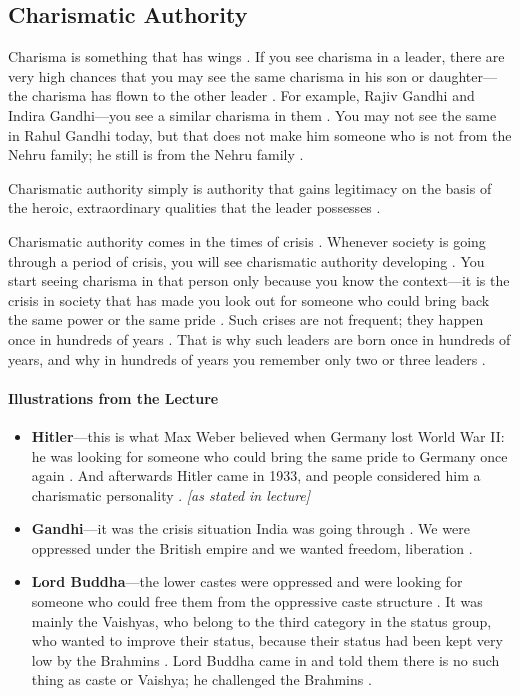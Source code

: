 \subsection{Charismatic Authority}
Charisma is something that has wings . If you see charisma in a leader, there are very high chances that you may see the same charisma in his son or daughter---the charisma has flown to the other leader .
For example, Rajiv Gandhi and Indira Gandhi---you see a similar charisma in them . You may not see the same in Rahul Gandhi today, but that does not make him someone who is not from the Nehru family; he still is from the Nehru family .

Charismatic authority simply is authority that gains legitimacy on the basis of the heroic, extraordinary qualities that the leader possesses .

\begin{KeyConcept}
Charismatic authority comes in the times of crisis . Whenever society is going through a period of crisis, you will see charismatic authority developing .
You start seeing charisma in that person only because you know the context---it is the crisis in society that has made you look out for someone who could bring back the same power or the same pride .
Such crises are not frequent; they happen once in hundreds of years . That is why such leaders are born once in hundreds of years, and why in hundreds of years you remember only two or three leaders .
\end{KeyConcept}

\paragraph{Illustrations from the Lecture}
\begin{itemize}
    \item \textbf{Hitler}---this is what Max Weber believed when Germany lost World War II: he was looking for someone who could bring the same pride to Germany once again . And afterwards Hitler came in 1933, and people considered him a charismatic personality . \textit{[as stated in lecture]}
    \item \textbf{Gandhi}---it was the crisis situation India was going through . We were oppressed under the British empire and we wanted freedom, liberation .
    \item \textbf{Lord Buddha}---the lower castes were oppressed and were looking for someone who could free them from the oppressive caste structure . It was mainly the Vaishyas, who belong to the third category in the status group, who wanted to improve their status, because their status had been kept very low by the Brahmins . Lord Buddha came in and told them there is no such thing as caste or Vaishya; he challenged the Brahmins .
\end{itemize}

